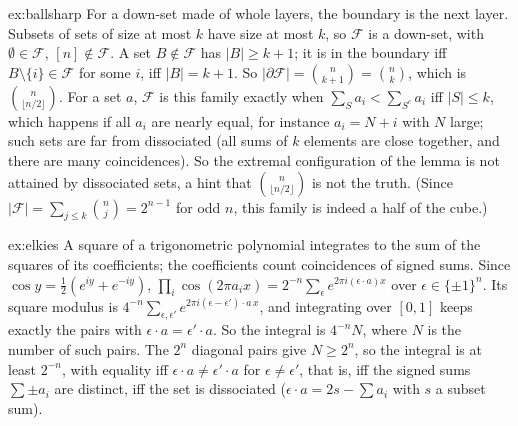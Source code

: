 \begin{solution}{ex:ballsharp}
\idea For a down-set made of whole layers, the boundary is the next layer.
\writeup Subsets of sets of size at most $k$ have size at most $k$, so $\mathcal F$ is a down-set, with $\emptyset\in\mathcal F$, $[n]\notin\mathcal F$. A set $B\notin\mathcal F$ has $|B|\ge k+1$; it is in the boundary
iff $B\setminus\{i\}\in\mathcal F$ for some $i$, iff $|B|=k+1$. So $|\partial\mathcal F|=\binom n{k+1}=\binom n k$, which is $\binom n{\lfloor n/2\rfloor}$. For a set $a$, $\mathcal F$ is this family exactly when
$\sum_Sa_i<\sum_{S^c}a_i$ iff $|S|\le k$, which happens if all $a_i$ are nearly equal, for instance $a_i=N+i$ with $N$ large; such sets are far from dissociated (all sums of
$k$ elements are close together, and there are many coincidences). So the extremal configuration of the lemma is not attained by dissociated sets, a hint that
$\binom n{\lfloor n/2\rfloor}$ is not the truth. (Since $|\mathcal F|=\sum_{j\le k}\binom nj=2^{n-1}$ for odd $n$, this family is indeed a half of the cube.)
\end{solution}

\begin{solution}{ex:elkies}
\idea A square of a trigonometric polynomial integrates to the sum of the squares of its coefficients; the coefficients count coincidences of signed sums.
\writeup Since $\cos y=\frac12(e^{iy}+e^{-iy})$, $\prod_i\cos(2\pi a_ix)=2^{-n}\sum_\epsilon e^{2\pi i(\epsilon\cdot a)x}$ over $\epsilon\in\{\pm1\}^n$. Its square modulus is $4^{-n}\sum_{\epsilon,\epsilon'}e^{2\pi i(\epsilon-\epsilon')\cdot a\,x}$,
and integrating over $[0,1]$ keeps exactly the pairs with $\epsilon\cdot a=\epsilon'\cdot a$. So the integral is $4^{-n}N$, where $N$ is the number of such pairs. The $2^n$ diagonal pairs give
$N\ge2^n$, so the integral is at least $2^{-n}$, with equality iff $\epsilon\cdot a\ne\epsilon'\cdot a$ for $\epsilon\ne\epsilon'$, that is, iff the signed sums $\sum\pm a_i$ are distinct, iff the set is
dissociated ($\epsilon\cdot a=2s-\sum a_i$ with $s$ a subset sum).
\end{solution}

